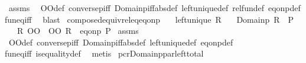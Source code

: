 \begin{isabellebody}
%
\isadelimproof
%
\endisadelimproof
%
\isatagproof
{}\isamarkupfalse%
\ assms\ \isamarkupfalse%
\ OO{\isacharunderscore}{\kern0pt}def\ conversep{\isacharunderscore}{\kern0pt}iff\ Domainp{\isacharunderscore}{\kern0pt}iff{\isacharbrackleft}{\kern0pt}abs{\isacharunderscore}{\kern0pt}def{\isacharbrackright}{\kern0pt}\ left{\isacharunderscore}{\kern0pt}unique{\isacharunderscore}{\kern0pt}def\ rel{\isacharunderscore}{\kern0pt}fun{\isacharunderscore}{\kern0pt}def\ eq{\isacharunderscore}{\kern0pt}onp{\isacharunderscore}{\kern0pt}def\isanewline
fun{\isacharunderscore}{\kern0pt}eq{\isacharunderscore}{\kern0pt}iff\ \isamarkupfalse%
\ blast%
\endisatagproof
{\isafoldproof}%
%
\isadelimproof
\isanewline
%
\endisadelimproof
\isanewline
{}\isamarkupfalse%
\ composed{\isacharunderscore}{\kern0pt}equiv{\isacharunderscore}{\kern0pt}rel{\isacharunderscore}{\kern0pt}eq{\isacharunderscore}{\kern0pt}eq{\isacharunderscore}{\kern0pt}onp{\isacharcolon}{\kern0pt}\isanewline
\ \ \ {\isachardoublequoteopen}left{\isacharunderscore}{\kern0pt}unique\ R{\isachardoublequoteclose}\isanewline
\ \ \ {\isachardoublequoteopen}Domainp\ R\ {\isacharequal}{\kern0pt}\ P{\isachardoublequoteclose}\isanewline
\ \ \ {\isachardoublequoteopen}{\isacharparenleft}{\kern0pt}R\ OO\ {\isacharparenleft}{\kern0pt}{\isacharequal}{\kern0pt}{\isacharparenright}{\kern0pt}\ OO\ R{\isasyminverse}{\isasyminverse}{\isacharparenright}{\kern0pt}\ {\isacharequal}{\kern0pt}\ eq{\isacharunderscore}{\kern0pt}onp\ P{\isachardoublequoteclose}\isanewline
%
\isadelimproof
%
\endisadelimproof
%
\isatagproof
{}\isamarkupfalse%
\ assms\ \isamarkupfalse%
\ OO{\isacharunderscore}{\kern0pt}def\ conversep{\isacharunderscore}{\kern0pt}iff\ Domainp{\isacharunderscore}{\kern0pt}iff{\isacharbrackleft}{\kern0pt}abs{\isacharunderscore}{\kern0pt}def{\isacharbrackright}{\kern0pt}\ left{\isacharunderscore}{\kern0pt}unique{\isacharunderscore}{\kern0pt}def\ eq{\isacharunderscore}{\kern0pt}onp{\isacharunderscore}{\kern0pt}def\isanewline
fun{\isacharunderscore}{\kern0pt}eq{\isacharunderscore}{\kern0pt}iff\ is{\isacharunderscore}{\kern0pt}equality{\isacharunderscore}{\kern0pt}def\ \isamarkupfalse%
\ metis%
\endisatagproof
{\isafoldproof}%
%
\isadelimproof
\isanewline
%
\endisadelimproof
\isanewline
{}\isamarkupfalse%
\ pcr{\isacharunderscore}{\kern0pt}Domainp{\isacharunderscore}{\kern0pt}par{\isacharunderscore}{\kern0pt}left{\isacharunderscore}{\kern0pt}total{\isacharcolon}{\kern0pt}\isanewline

\end{isabellebody}
